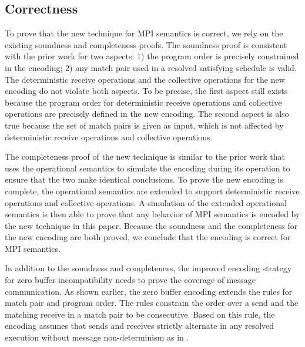 

\subsection{Correctness}

To prove that the new technique for MPI semantics is correct, we rely on the existing soundness and completeness proofs. The soundness proof is consistent with the prior work for two aspects: 1) the program order is precisely constrained in the encoding; 2) any match pair used in a resolved satisfying schedule is valid. The deterministic receive operations and the collective operations for the new encoding do not violate both aspects. To be precise, the first aspect still exists because the program order for deterministic receive operations and collective operations are precisely defined in the new encoding. The second aspect is also true because the set of match pairs is given as input, which is not affected by deterministic receive operations and collective operations.

The completeness proof of the new technique is similar to the prior work that uses the operational semantics to simulate the encoding during its operation to ensure that the two make identical conclusions. To prove the new encoding is complete, the operational semantics are extended to support deterministic receive operations and collective operations. A simulation of the extended operational semantics is then able to prove that any behavior of MPI semantics is encoded by the new technique in this paper. Because the soundness and the completeness for the new encoding are both proved, we conclude that the encoding is correct for MPI semantics.

In addition to the soundness and completeness, the improved encoding strategy for zero buffer incompatibility needs to prove the coverage of message communication. As shown earlier, the zero buffer encoding extends the rules for match pair and program order. The rules constrain the order over a send and the matching receive in a match pair to be consecutive. Based on this rule, the encoding assumes that sends and receives strictly alternate in any resolved execution without message non-determinism as in . 

